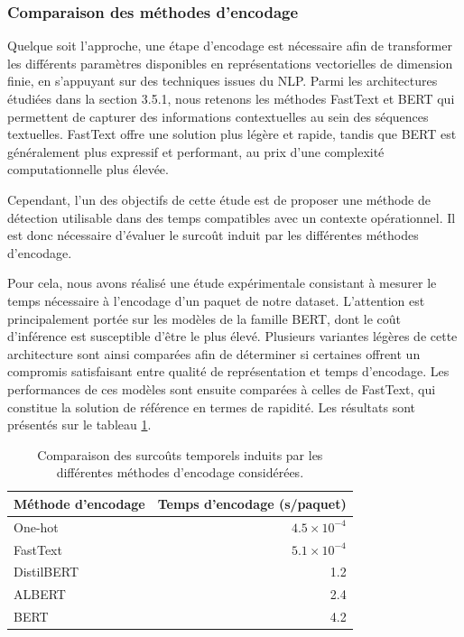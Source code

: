 \documentclass[a4paper,11pt,twoside]{StyleThese}
\begin{document}
\subsubsection{Comparaison des méthodes d'encodage}
Quelque soit l'approche, une étape d’encodage est nécessaire afin de transformer les différents paramètres disponibles en représentations vectorielles de dimension finie, en s’appuyant sur des techniques issues du NLP. Parmi les architectures étudiées dans la section 3.5.1, nous retenons les méthodes FastText et BERT qui permettent de capturer des informations contextuelles au sein des séquences textuelles. FastText offre une solution plus légère et rapide, tandis que BERT est généralement plus expressif et performant, au prix d’une complexité computationnelle plus élevée.

Cependant, l'un des objectifs de cette étude est de proposer une méthode de détection utilisable dans des temps compatibles avec un contexte opérationnel. Il est donc nécessaire d'évaluer le surcoût induit par les différentes méthodes d'encodage.

Pour cela, nous avons réalisé une étude expérimentale consistant à mesurer le temps nécessaire à l'encodage d'un paquet de notre dataset. L'attention est principalement portée sur les modèles de la famille BERT, dont le coût d'inférence est susceptible d'être le plus élevé. Plusieurs variantes légères de cette architecture sont ainsi comparées afin de déterminer si certaines offrent un compromis satisfaisant entre qualité de représentation et temps d'encodage. Les performances de ces modèles sont ensuite comparées à celles de FastText, qui constitue la solution de référence en termes de rapidité. Les résultats sont présentés sur le tableau \ref{tab:exec_time_encod}.

\begin{table}[!ht]
\centering
\begin{tabular}{l r}
\hline
\textbf{Méthode d'encodage} & \textbf{Temps d'encodage (s/paquet)} \\
\hline
One-hot & $4.5 \times 10^{-4}$ \\
FastText & $5.1 \times 10^{-4}$ \\
DistilBERT & 1.2 \\
ALBERT & 2.4 \\
BERT & 4.2 \\
\hline
\end{tabular}
\caption{Comparaison des surcoûts temporels induits par les différentes méthodes d'encodage considérées.}
\label{tab:exec_time_encod}
\end{table}
\end{document}
